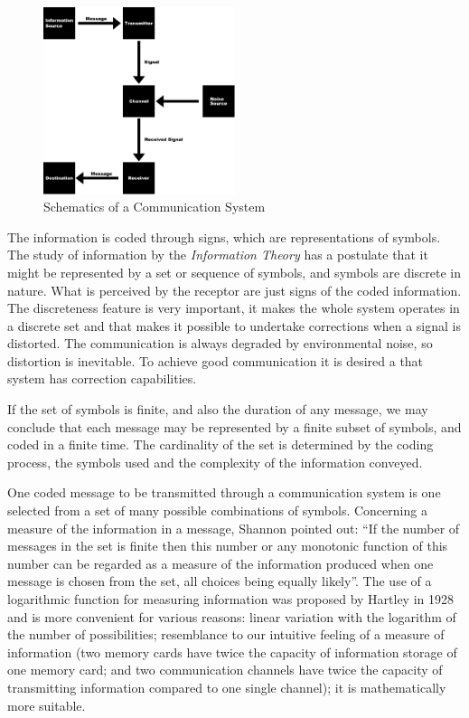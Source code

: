 \begin{figure}[htbp]
\centering
\includegraphics[width=0.5\textwidth]{images/communication_system.pdf}
\caption{Schematics of a Communication System}
\label{fig:communication_system}
\end{figure}  

The information is coded through signs, which are representations of symbols. The study of 
information by the \textit{Information Theory} has a postulate that it might be represented
by a set or sequence of symbols, and symbols are discrete in nature. What is perceived
by the receptor are just signs of the coded information. The discreteness feature is very important,
it makes the whole system operates in a discrete set 
and that makes it possible to undertake corrections 
when a signal is distorted. The communication is always degraded by environmental noise, so distortion 
is inevitable. To achieve good communication it is desired a that system has correction capabilities.

If the set of symbols is finite, and also the duration of any message, we may conclude that each message may
be represented by a finite subset of symbols, and coded in a finite time. 
The cardinality of the set is determined
by the coding process, the symbols used and the complexity of the information conveyed.

One coded message to be transmitted through a communication system is one 
selected from a set of many possible combinations of symbols. 
Concerning a measure of the information in a message, 
Shannon pointed out: ``If the number of messages in the set is finite then this number or any monotonic function
of this number can be regarded as a measure of the information produced when one message is chosen from the set,
all choices being equally likely''\citep{shannon1948}. 
The use of a logarithmic function for measuring information
was proposed by Hartley \citep{hartley1928} in 1928 and is more convenient for various reasons: 
linear variation with the logarithm of the number of possibilities; 
resemblance to our intuitive feeling of a measure of information 
(two memory cards have twice the capacity of information storage of one memory card; and 
two communication channels have twice the capacity of transmitting information compared to one single channel); 
it is mathematically more suitable.


